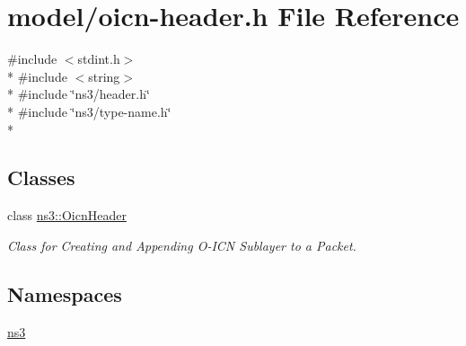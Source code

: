 \hypertarget{oicn-header_8h}{\section{model/oicn-\/header.h File Reference}
\label{oicn-header_8h}
}
{\ttfamily \#include $<$stdint.\-h$>$}\\*
{\ttfamily \#include $<$string$>$}\\*
{\ttfamily \#include \char`\"{}ns3/header.\-h\char`\"{}}\\*
{\ttfamily \#include \char`\"{}ns3/type-\/name.\-h\char`\"{}}\\*
\subsection*{Classes}
\begin{DoxyCompactItemize}
\item 
class \hyperlink{classns3_1_1OicnHeader}{ns3\-::\-Oicn\-Header}
\begin{DoxyCompactList}\small\item\em Class for Creating and Appending O-\/\-I\-C\-N Sublayer to a Packet. \end{DoxyCompactList}\end{DoxyCompactItemize}
\subsection*{Namespaces}
\begin{DoxyCompactItemize}
\item 
\hyperlink{namespacens3}{ns3}
\end{DoxyCompactItemize}
